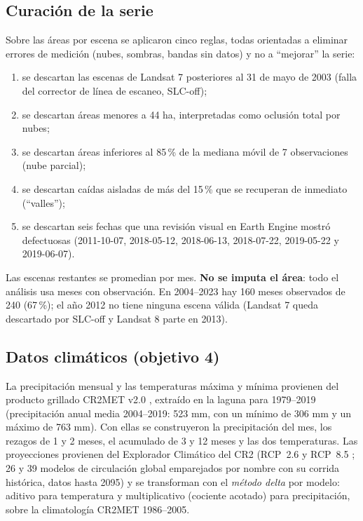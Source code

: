 \documentclass[11pt,a4paper]{article}
\begin{document}
\subsection{Curación de la serie}

Sobre las áreas por escena se aplicaron cinco reglas, todas orientadas a eliminar errores de medición (nubes, sombras, bandas sin datos) y no a ``mejorar'' la serie:
\begin{enumerate}
\item se descartan las escenas de Landsat 7 posteriores al 31 de mayo de 2003 (falla del corrector de línea de escaneo, SLC-off);
\item se descartan áreas menores a 44 ha, interpretadas como oclusión total por nubes;
\item se descartan áreas inferiores al 85\,\% de la mediana móvil de 7 observaciones (nube parcial);
\item se descartan caídas aisladas de más del 15\,\% que se recuperan de inmediato (``valles'');
\item se descartan seis fechas que una revisión visual en Earth Engine mostró defectuosas (2011-10-07, 2018-05-12, 2018-06-13, 2018-07-22, 2019-05-22 y 2019-06-07).
\end{enumerate}
Las escenas restantes se promedian por mes. \textbf{No se imputa el área}: todo el análisis usa meses con observación. En 2004--2023 hay 160 meses observados de 240 (67\,\%); el año 2012 no tiene ninguna escena válida (Landsat 7 queda descartado por SLC-off y Landsat 8 parte en 2013).

\subsection{Datos climáticos (objetivo 4)}

La precipitación mensual y las temperaturas máxima y mínima provienen del producto grillado CR2MET v2.0 \cite{cr2met}, extraído en la laguna para 1979--2019 (precipitación anual media 2004--2019: 523 mm, con un mínimo de 306 mm y un máximo de 763 mm). Con ellas se construyeron la precipitación del mes, los rezagos de 1 y 2 meses, el acumulado de 3 y 12 meses y las dos temperaturas. Las proyecciones provienen del Explorador Climático del CR2 (RCP~2.6 y RCP~8.5 \cite{vanvuuren2011}; 26 y 39 modelos de circulación global emparejados por nombre con su corrida histórica, datos hasta 2095) y se transforman con el \emph{método delta} por modelo: aditivo para temperatura y multiplicativo (cociente acotado) para precipitación, sobre la climatología CR2MET 1986--2005.
\end{document}
